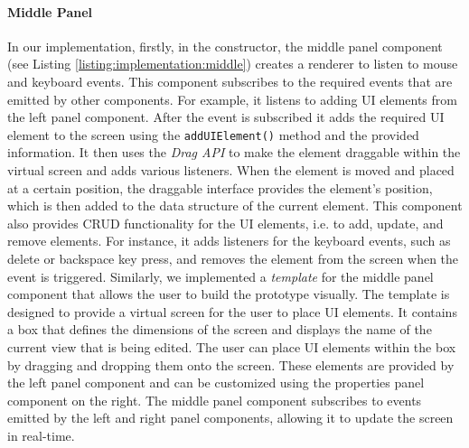 \paragraph{Middle Panel}
In our implementation, firstly, in the constructor, the middle panel component (see Listing \ref{listing:implementation:middle}) creates a renderer to listen to mouse and keyboard events.
This component subscribes to the required events that are emitted by other components. 
For example, it listens to adding UI elements from the left panel component. 
After the event is subscribed it adds the required UI element to the screen using the \texttt{addUIElement()} method and the provided information.
It then uses the \textit{Drag API} to make the element draggable within the virtual screen and adds various listeners.
When the element is moved and placed at a certain position, the draggable interface provides the element's position, which is then added to the data structure of the current element.  
This component also provides CRUD functionality for the UI elements, i.e. to add, update, and remove elements.
For instance, it adds listeners for the keyboard events, such as delete or backspace key press, and removes the element from the screen when the event is triggered.
Similarly, we implemented a \textit{template} for the middle panel component that allows the user to build the prototype visually. 
The template is designed to provide a virtual screen for the user to place UI elements. 
It contains a box that defines the dimensions of the screen and displays the name of the current view that is being edited. 
The user can place UI elements within the box by dragging and dropping them onto the screen. 
These elements are provided by the left panel component and can be customized using the properties panel component on the right. 
The middle panel component subscribes to events emitted by the left and right panel components, allowing it to update the screen in real-time.

